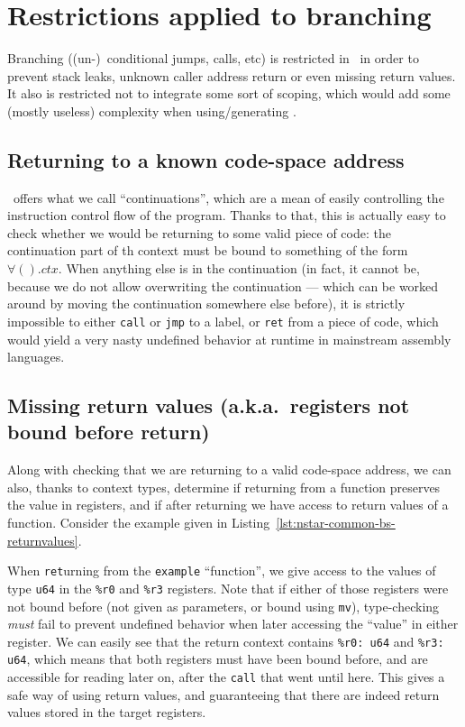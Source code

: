 \section{Restrictions applied to branching}\label{sec:nstar-common-bs-restrictions}

Branching ((un-)\ conditional jumps, calls, etc) is restricted in \nstar\ in order to prevent stack leaks, unknown caller address return or even missing return values.
It also is restricted not to integrate some sort of scoping, which would add some (mostly useless) complexity when using/generating \nstar.

\subsection{Returning to a known code-space address}\label{subsec:nstar-common-bs-restrictions-ret}

\nstar\ offers what we call ``continuations'', which are a mean of easily controlling the instruction control flow of the program.
Thanks to that, this is actually easy to check whether we would be returning to some valid piece of code: the continuation part of th context must be bound to something of the form $\forall().ctx$.
When anything else is in the continuation (in fact, it cannot be, because we do not allow overwriting the continuation --- which can be worked around by moving the continuation somewhere else before), it is strictly impossible to either \texttt{call} or \texttt{jmp} to a label, or \texttt{ret} from a piece of code, which would yield a very nasty undefined behavior at runtime in mainstream assembly languages.

\subsection{Missing return values (a.k.a.\ registers not bound before return)}\label{subsec:nstar-common-bs-restrictions-unboundregs}

Along with checking that we are returning to a valid code-space address, we can also, thanks to context types, determine if returning from a function preserves the value in registers, and if after returning we have access to return values of a function.
Consider the example given in Listing~\ref{lst:nstar-common-bs-returnvalues}.

When \texttt{ret}urning from the \texttt{example} ``function'', we give access to the values of type \texttt{u64} in the \texttt{\%r0} and \texttt{\%r3} registers.
Note that if either of those registers were not bound before (not given as parameters, or bound using \texttt{mv}), type-checking \textit{must} fail to prevent undefined behavior when later accessing the ``value'' in either register.
We can easily see that the return context contains \texttt{\%r0: u64} and \texttt{\%r3: u64}, which means that both registers must have been bound before, and are accessible for reading later on, after the \texttt{call} that went until here.
This gives a safe way of using return values, and guaranteeing that there are indeed return values stored in the target registers.

